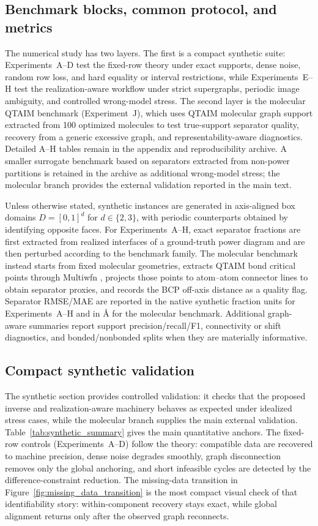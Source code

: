 \documentclass[preprint,12pt]{elsarticle}
\begin{document}
\subsection{Benchmark blocks, common protocol, and metrics}
The numerical study has two layers. The first is a compact synthetic suite:
Experiments~A--D test the fixed-row theory under exact supports, dense noise,
random row loss, and hard equality or interval restrictions, while
Experiments~E--H test the realization-aware workflow under strict supergraphs,
periodic image ambiguity, and controlled wrong-model stress. The second layer
is the molecular QTAIM benchmark (Experiment~J), which uses QTAIM molecular
graph support extracted from 100 optimized molecules to test true-support
separator quality, recovery from a generic excessive graph, and
representability-aware diagnostics. Detailed A--H tables remain in the
appendix and reproducibility archive. A smaller surrogate benchmark based on
separators extracted from non-power partitions is retained in the archive as
additional wrong-model stress; the molecular branch provides the external
validation reported in the main text.

Unless otherwise stated, synthetic instances are generated in axis-aligned box
domains $D=[0,1]^d$ for $d\in\{2,3\}$, with periodic counterparts obtained by
identifying opposite faces. For Experiments~A--H, exact separator fractions are
first extracted from realized interfaces of a ground-truth power diagram and
are then perturbed according to the benchmark family. The molecular benchmark
instead starts from fixed molecular geometries, extracts QTAIM bond critical
points through Multiwfn \cite{LuChen2012,Lu2024Multiwfn}, projects those points
to atom--atom connector lines to obtain separator proxies, and records the BCP
off-axis distance as a quality flag. Separator RMSE/MAE are reported in the
native synthetic fraction units for Experiments~A--H and in \AA{} for the
molecular benchmark. Additional graph-aware summaries report support
precision/recall/F1, connectivity or shift diagnostics, and bonded/nonbonded
splits when they are materially informative.

\subsection{Compact synthetic validation}
The synthetic section provides controlled validation: it checks that the
proposed inverse and realization-aware machinery behaves as expected under
idealized stress cases, while the molecular branch supplies the main external
validation. Table~\ref{tab:synthetic_summary} gives the main quantitative
anchors. The fixed-row controls (Experiments~A--D) follow the theory:
compatible data are recovered to machine precision, dense noise degrades
smoothly, graph disconnection removes only the global anchoring, and short
infeasible cycles are detected by the difference-constraint reduction. The
missing-data transition in Figure~\ref{fig:missing_data_transition} is the
most compact visual check of that identifiability story: within-component
recovery stays exact, while global alignment returns only after the observed
graph reconnects.
\end{document}
